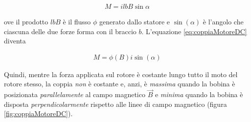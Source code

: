 \documentclass[17pt]{extarticle}
\begin{document}
\begin{eqnarray}\label{eq:coppiaMotoreDC}
	M = ilbB\sin\alpha 
\end{eqnarray}

































































ove il prodotto  $lbB$ è il flusso $\phi$ generato dallo statore e $\sin(\alpha)$ è l'angolo che ciascuna delle due forze forma con il braccio $b$. L'equazione \ref{eq:coppiaMotoreDC} diventa

\begin{eqnarray}\label{eq:coppiaRotore}
	M = \phi(B)i\sin(\alpha)
\end{eqnarray}

Quindi, mentre la forza applicata sul rotore è costante lungo tutto il moto del rotore stesso, la coppia \emph{non} è costante e, anzi, è \emph{massima} quando la bobina è posizionata \emph{parallelamente} al campo magnetico $\vec{B}$ e \emph{minima} quando la bobina è disposta \emph{perpendicolarmente} rispetto alle linee di campo magnetico (figura \ref{fig:coppiaMotoreDC}). 
\end{document}
